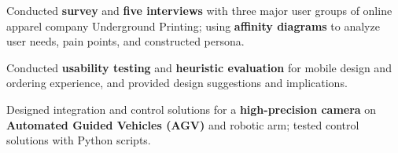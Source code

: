 \vspace{-1.0mm}
\resumeItemListStart
\item Conducted \textbf{survey} and \textbf{five interviews} with three major user groups of online apparel company Underground Printing; using \textbf{affinity diagrams} to analyze user needs, pain points, and constructed persona. 
\item Conducted \textbf{usability testing} and \textbf{heuristic evaluation} for mobile design and ordering experience, and provided design suggestions and implications.
\resumeItemListEnd
\vspace{-2.0mm}

        \vspace{-1.0mm}
      \resumeItemListStart
        \item{Designed integration and control solutions for a \textbf{high-precision camera} on \textbf{Automated Guided Vehicles (AGV)} and robotic arm; tested control solutions with Python scripts.}
      \resumeItemListEnd


 \vspace{-8.0mm}

